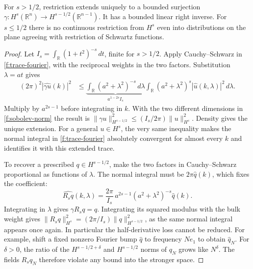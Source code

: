 \begin{theorem}\label{f:plane-trace}
For $s>1/2$, restriction extends uniquely to a bounded surjection $\gamma:H^s(\mathbb R^n)\to H^{s-1/2}(\mathbb R^{n-1})$. It has a bounded linear right inverse. For $s\leq1/2$ there is no continuous restriction from $H^s$ even into distributions on the plane agreeing with restriction of Schwartz functions.
\end{theorem}
\begin{proof}
Let $I_s=\int_{\mathbb R}(1+t^2)^{-s}\,dt$, finite for $s>1/2$. Apply Cauchy--Schwarz in \eqref{f:trace-fourier}, with the reciprocal weights in the two factors. Substitution $\lambda=at$ gives
\begin{align*}
  (2\pi)^2 |\widehat{\gamma u}(k)|^2
  &\leq \underbrace{\int_{\mathbb R}(a^2+\lambda^2)^{-s}\,d\lambda}_{a^{1-2s}I_s}
         \int_{\mathbb R}(a^2+\lambda^2)^s |\widehat u(k,\lambda)|^2\,d\lambda .
\end{align*}
Multiply by $a^{2s-1}$ before integrating in $k$. With the two different dimensions in \eqref{f:sobolev-norm} the result is $\|\gamma u\|_{H^{s-1/2}}^2\leq (I_s/2\pi)\|u\|_{H^s}^2$. Density gives the unique extension. For a general $u\in H^s$, the very same inequality makes the normal integral in \eqref{f:trace-fourier} absolutely convergent for almost every $k$ and identifies it with this extended trace.

To recover a prescribed $q\in H^{s-1/2}$, make the two factors in Cauchy--Schwarz proportional as functions of $\lambda$. The normal integral must be $2\pi\widehat q(k)$, which fixes the coefficient:
\begin{equation}
 \widehat{R_s q}(k,\lambda)=\frac{2\pi}{I_s}\,a^{2s-1}(a^2+\lambda^2)^{-s}\widehat q(k).\label{f:trace-lift}
\end{equation}
Integrating in $\lambda$ gives $\gamma R_s q=q$. Integrating its squared modulus with the bulk weight gives $\|R_s q\|_{H^s}^2=(2\pi/I_s)\|q\|_{H^{s-1/2}}^2$, as the same normal integral appears once again. In particular the half-derivative loss cannot be reduced. For example, shift a fixed nonzero Fourier bump $\widehat q$ to frequency $Ne_1$ to obtain $\widehat q_N$. For $\delta>0$, the ratio of the $H^{s-1/2+\delta}$ and $H^{s-1/2}$ norms of $q_N$ grows like $N^\delta$. The fields $R_s q_N$ therefore violate any bound into the stronger space.


\end{proof}
